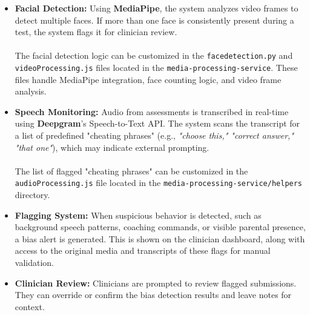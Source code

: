 \documentclass{article}
\begin{document}
\begin{itemize}
    \item \textbf{Facial Detection:} Using \textbf{MediaPipe}, the system analyzes video frames to detect multiple faces. If more than one face is consistently present during a test, the system flags it for clinician review. \\\\
    The facial detection logic can be customized in the \texttt{facedetection.py} and \texttt{videoProcessing.js} files located in the \texttt{media-processing-service}. These files handle MediaPipe integration, face counting logic, and video frame analysis.

    \item \textbf{Speech Monitoring:} Audio from assessments is transcribed in real-time using \textbf{Deepgram}'s Speech-to-Text API. The system scans the transcript for a list of predefined "cheating phrases" 
    (e.g., \textit{"choose this," "correct answer," "that one"}), which may indicate external prompting. \\\\
    The list of flagged "cheating phrases" can be customized in the \texttt{audioProcessing.js} file located in the \texttt{media-processing-service/helpers} directory.

    \item \textbf{Flagging System:} When suspicious behavior is detected, such as background speech patterns, coaching commands, or visible parental presence, a bias alert is generated. This is shown on the clinician dashboard, along with access to the original media 
    and transcripts of these flags for manual validation.

    \item \textbf{Clinician Review:} Clinicians are prompted to review flagged submissions. They can override or confirm the bias detection results and leave notes for context.
\end{itemize}
\end{document}
